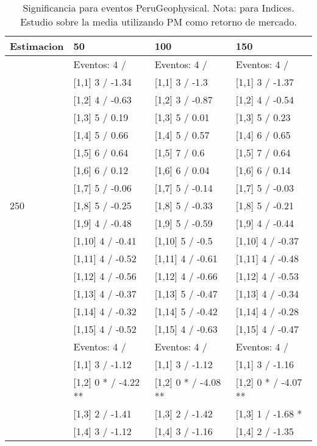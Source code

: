 \begin{table}

\caption{Significancia para eventos PeruGeophysical. Nota: para Indices. Estudio sobre la media utilizando PM como retorno de mercado.}
\centering
\begin{tabular}[t]{llll}
\toprule
Estimacion & 50 & 100 & 150\\
\midrule
 & Eventos:  4 / & Eventos:  4 / & Eventos:  4 /\\
 & {}[1,1] 3  / -1.34 & {}[1,1] 3  / -1.3 & {}[1,1] 3  / -1.37\\
 & {}[1,2] 4  / -0.63 & {}[1,2] 3  / -0.87 & {}[1,2] 4  / -0.54\\
 & {}[1,3] 5  / 0.19 & {}[1,3] 5  / 0.01 & {}[1,3] 5  / 0.23\\
 & {}[1,4] 5  / 0.66 & {}[1,4] 5  / 0.57 & {}[1,4] 6  / 0.65\\
\addlinespace
 & {}[1,5] 6  / 0.64 & {}[1,5] 7  / 0.6 & {}[1,5] 7  / 0.64\\
 & {}[1,6] 6  / 0.12 & {}[1,6] 6  / 0.04 & {}[1,6] 6  / 0.14\\
 & {}[1,7] 5  / -0.06 & {}[1,7] 5  / -0.14 & {}[1,7] 5  / -0.03\\
250 & {}[1,8] 5  / -0.25 & {}[1,8] 5  / -0.33 & {}[1,8] 5  / -0.21\\
 & {}[1,9] 4  / -0.48 & {}[1,9] 5  / -0.59 & {}[1,9] 4  / -0.44\\
\addlinespace
 & {}[1,10] 4  / -0.41 & {}[1,10] 5  / -0.5 & {}[1,10] 4  / -0.37\\
 & {}[1,11] 4  / -0.52 & {}[1,11] 4  / -0.61 & {}[1,11] 4  / -0.48\\
 & {}[1,12] 4  / -0.56 & {}[1,12] 4  / -0.66 & {}[1,12] 4  / -0.53\\
 & {}[1,13] 4  / -0.37 & {}[1,13] 5  / -0.47 & {}[1,13] 4  / -0.34\\
 & {}[1,14] 4  / -0.32 & {}[1,14] 5  / -0.42 & {}[1,14] 4  / -0.28\\
\addlinespace
 & {}[1,15] 4  / -0.52 & {}[1,15] 4  / -0.63 & {}[1,15] 4  / -0.47\\
 & Eventos:  4 / & Eventos:  4 / & Eventos:  4 /\\
 & {}[1,1] 3  / -1.12 & {}[1,1] 3  / -1.12 & {}[1,1] 3  / -1.16\\
 & {}[1,2] 0 * / -4.22 ** & {}[1,2] 0 * / -4.08 ** & {}[1,2] 0 * / -4.07 **\\
 & {}[1,3] 2  / -1.41 & {}[1,3] 2  / -1.42 & {}[1,3] 1  / -1.68 *\\
\addlinespace
 & {}[1,4] 3  / -1.12 & {}[1,4] 3  / -1.16 & {}[1,4] 2  / -1.35\\

\end{tabular}
\end{table}
